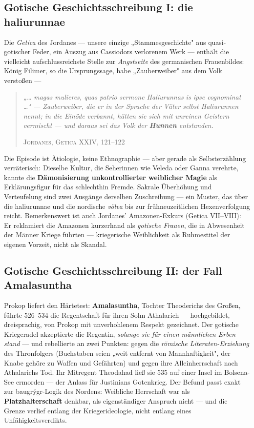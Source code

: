 \documentclass[11pt,a4paper,ngerman]{scrartcl}
\newcommand{\chipbase}[2]{\hspace{0pt}{\footnotesize\textcolor{#1}{[\textsc{#2}]}}}
\newcommand{\chipbelegt}[1]{\chipbase{chipgreen}{#1}}
\newcommand{\chipplausibel}[1]{\chipbase{chipamber}{#1}}
\begin{document}
\subsection*{Gotische Geschichtsschreibung I: die haliurunnae}

Die \emph{Getica} des Jordanes — unsere einzige „Stammesgeschichte" aus quasi-gotischer Feder, ein Auszug aus Cassiodors verlorenem Werk — enthält die vielleicht aufschlussreichste Stelle zur \emph{Angstseite} des germanischen Frauenbildes: König Filimer, so die Ursprungssage, habe „Zauberweiber" aus dem Volk verstoßen —

\begin{quotation}\small\itshape
„… magas mulieres, quas patrio sermone Haliurunnas is ipse cognominat …" — Zauberweiber, die er in der Sprache der Väter selbst Haliurunnen nennt; in die Einöde verbannt, hätten sie sich mit unreinen Geistern vermischt — und daraus sei das Volk der \textbf{Hunnen} entstanden.
\par\nopagebreak\smallskip\hfill{\footnotesize\upshape\textsc{Jordanes, Getica XXIV, 121–122}}
\end{quotation}

Die Episode ist Ätiologie, keine Ethnographie — aber gerade als Selbsterzählung verräterisch: Dieselbe Kultur, die Seherinnen wie Veleda oder Ganna verehrte, kannte die \textbf{Dämonisierung unkontrollierter weiblicher Magie} als Erklärungsfigur für das schlechthin Fremde. Sakrale Überhöhung und Verteufelung sind zwei Ausgänge derselben Zuschreibung — ein Muster, das über die haliurunnae und die nordische \emph{völva} bis zur frühneuzeitlichen Hexenverfolgung reicht. \chipplausibel{plausibel} Bemerkenswert ist auch Jordanes' Amazonen-Exkurs (Getica VII–VIII): Er reklamiert die Amazonen kurzerhand als \emph{gotische Frauen}, die in Abwesenheit der Männer Kriege führten — kriegerische Weiblichkeit als Ruhmestitel der eigenen Vorzeit, nicht als Skandal. \chipbelegt{belegt}

\subsection*{Gotische Geschichtsschreibung II: der Fall Amalasuntha}

Prokop liefert den Härtetest: \textbf{Amalasuntha}, Tochter Theoderichs des Großen, führte 526–534 die Regentschaft für ihren Sohn Athalarich — hochgebildet, dreisprachig, von Prokop mit unverhohlenem Respekt gezeichnet. Der gotische Kriegeradel akzeptierte die Regentin, \emph{solange sie für einen männlichen Erben stand} — und rebellierte an zwei Punkten: gegen die \emph{römische Literaten-Erziehung} des Thronfolgers (Buchstaben seien „weit entfernt von Mannhaftigkeit", der Knabe gehöre zu Waffen und Gefährten) und gegen ihre Alleinherrschaft nach Athalarichs Tod. Ihr Mitregent Theodahad ließ sie 535 auf einer Insel im Bolsena-See ermorden — der Anlass für Justinians Gotenkrieg. \chipbelegt{belegt} Der Befund passt exakt zur baugrýgr-Logik des Nordens: Weibliche Herrschaft war als \textbf{Platzhalterschaft} denkbar, als eigenständiger Anspruch nicht — und die Grenze verlief entlang der Kriegerideologie, nicht entlang eines Unfähigkeitsverdikts. \chipplausibel{plausibel}
\end{document}
